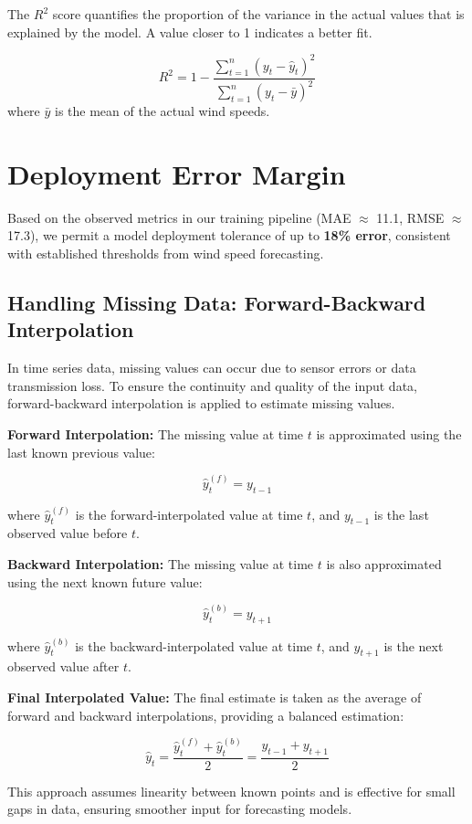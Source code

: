 The $R^2$ score quantifies the proportion of the variance in the actual values that is explained by the model. A value closer to 1 indicates a better fit.

\begin{equation}
	R^2 = 1 - \frac{\sum_{t=1}^n (y_t - \hat{y}_t)^2}{\sum_{t=1}^n (y_t - \bar{y})^2}
\end{equation}
where $\bar{y}$ is the mean of the actual wind speeds.

\section{Deployment Error Margin}

Based on the observed metrics in our training pipeline (MAE $\approx$ 11.1, RMSE $\approx$ 17.3), we permit a model deployment tolerance of up to \textbf{18\% error}, consistent with established thresholds from wind speed forecasting.

\subsection{Handling Missing Data: Forward-Backward Interpolation}

In time series data, missing values can occur due to sensor errors or data transmission loss. To ensure the continuity and quality of the input data, forward-backward interpolation is applied to estimate missing values.

\textbf{Forward Interpolation:} The missing value at time $t$ is approximated using the last known previous value:

\begin{equation}
	\hat{y}_t^{(f)} = y_{t-1}
\end{equation}

where $\hat{y}_t^{(f)}$ is the forward-interpolated value at time $t$, and $y_{t-1}$ is the last observed value before $t$.

\textbf{Backward Interpolation:} The missing value at time $t$ is also approximated using the next known future value:

\begin{equation}
	\hat{y}_t^{(b)} = y_{t+1}
\end{equation}

where $\hat{y}_t^{(b)}$ is the backward-interpolated value at time $t$, and $y_{t+1}$ is the next observed value after $t$.

\textbf{Final Interpolated Value:} The final estimate is taken as the average of forward and backward interpolations, providing a balanced estimation:

\begin{equation}
	\hat{y}_t = \frac{\hat{y}_t^{(f)} + \hat{y}_t^{(b)}}{2} = \frac{y_{t-1} + y_{t+1}}{2}
\end{equation}

This approach assumes linearity between known points and is effective for small gaps in data, ensuring smoother input for forecasting models.
